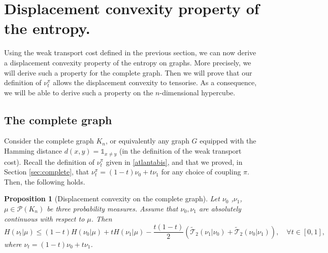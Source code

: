 \documentclass[11pt]{amsart}
\newtheorem{prop}[equation]{Proposition}
\numberwithin{equation}{section}
\begin{document}
\section{Displacement convexity property of the entropy.} \label{sec:Section DC}

Using the weak transport cost defined in the previous section, we can now derive a displacement convexity property of the entropy on graphs. 
More precisely, we will derive such a property for the complete graph. Then we will prove that  our definition of $\nu_t^\pi$ allows the displacement convexity to tensorise. As a consequence, we will be able to derive such a property on the $n$-dimensional hypercube.

\subsection{The complete graph}

Consider the complete graph $K_n$, or equivalently any graph $G$ equipped with the Hamming distance $d(x,y)={\mathds{1}}_{x \neq y}$ (in the definition of the weak transport cost). Recall the definition of $\nu_t^\pi$ given in \eqref{atlantabis}, and
that we proved, in Section \ref{sec:complete}, that $\nu_t^\pi=(1-t)\nu_0+t\nu_1$ for any choice of coupling $\pi$.
Then, the following holds.

\begin{prop}[Displacement convexity on the complete graph]\label{convexity}
Let $\nu_0$ ,$\nu_1$, $\mu \in \mathcal{P}(K_n)$ be three probability measures. Assume that $\nu_0,\nu_1$ are absolutely continuous with respect to $\mu$. Then
$$
H(\nu_t|\mu)\leq (1-t)H(\nu_0|\mu)+tH(\nu_1|\mu)-\frac{t(1-t)}{2}\left({\widetilde{\mathcal{T}}}_2(\nu_1|\nu_0)+{\widetilde{\mathcal{T}}}_2(\nu_0|\nu_1)\right),\quad \forall t\in [0,1],
$$
where $\nu_t=(1-t)\nu_0+t\nu_1$.
\end{prop}
\end{document}
